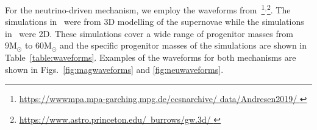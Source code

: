 \documentclass[aps,twocolumn,showpacs,groupedaddress, nofootinbib]{revtex4}  %
\begin{document}
%
%
For the neutrino-driven mechanism, we employ the waveforms
from~\cite{10.1093mnrasstz990, kuroda2017correlated, muller2012parametrized,
powell2019gravitational, radice2019characterizing, yakunin2015gravitational,
yakunin2017gravitational, ott2009gravitational, murphy2009model,
ott2013general}\footnote{\href{https://wwwmpa.mpa-garching.mpg.de/ccsnarchive/data/Andresen2019/}
{https://wwwmpa.mpa-garching.mpg.de/ccsnarchive/
data/Andresen2019/ }}$^{,}$\footnote{\href{ https://www.astro.princeton.edu/~burrows/gw.3d/  }
{ https://www.astro.princeton.edu/~burrows/gw.3d/  }}. The simulations in~\cite{10.1093mnrasstz990,
kuroda2017correlated, muller2012parametrized, powell2019gravitational,
radice2019characterizing, yakunin2017gravitational, ott2013general} were from 3D modelling of
the supernovae while the simulations in~\cite{yakunin2015gravitational,
ott2009gravitational, murphy2009model} were 2D. These
simulations cover a wide range of progenitor masses from $9\text{M}_\odot$ to
$60\text{M}_\odot$ and the specific progenitor masses of the simulations are
shown in Table~\ref{table:waveforms}. Examples of the waveforms for
both mechanisms are shown in Figs.~\ref{fig:magwaveforms} and
\ref{fig:neuwaveforms}.
\end{document}

